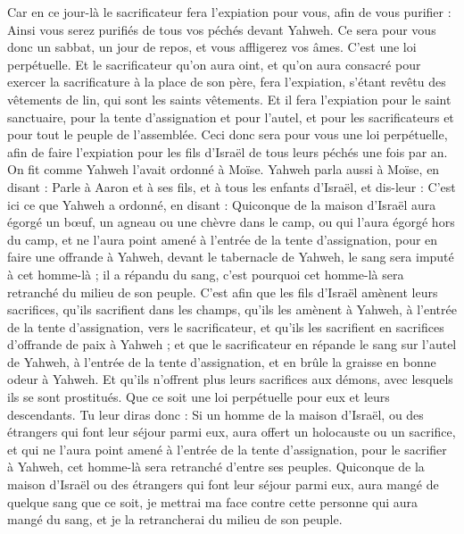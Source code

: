 \begin{multicols}{2}
Car en ce jour-là le sacrificateur fera l’expiation pour vous, afin de vous purifier : Ainsi vous serez purifiés de tous vos péchés devant Yahweh.
Ce sera pour vous donc un sabbat, un jour de repos, et vous affligerez vos âmes. C'est une loi perpétuelle.
Et le sacrificateur qu'on aura oint, et qu'on aura consacré pour exercer la sacrificature à la place de son père, fera l’expiation, s'étant revêtu des vêtements de lin, qui sont les saints vêtements.
Et il fera l’expiation pour le saint sanctuaire, pour la tente d'assignation et pour l'autel, et pour les sacrificateurs et pour tout le peuple de l'assemblée.
Ceci donc sera pour vous une loi perpétuelle, afin de faire l’expiation pour les fils d'Israël de tous leurs péchés une fois par an. On fit comme Yahweh l'avait ordonné à Moïse.
\VerseOne{}Yahweh parla aussi à Moïse, en disant :
Parle à Aaron et à ses fils, et à tous les enfants d'Israël, et dis-leur : C'est ici ce que Yahweh a ordonné, en disant :
Quiconque de la maison d'Israël aura égorgé un bœuf, un agneau ou une chèvre dans le camp, ou qui l'aura égorgé hors du camp,
et ne l'aura point amené à l'entrée de la tente d'assignation, pour en faire une offrande à Yahweh, devant le tabernacle de Yahweh, le sang sera imputé à cet homme-là ; il a répandu du sang, c'est pourquoi cet homme-là sera retranché du milieu de son peuple.
C’est afin que les fils d'Israël amènent leurs sacrifices, qu’ils sacrifient dans les champs, qu'ils les amènent à Yahweh, à l'entrée de la tente d'assignation, vers le sacrificateur, et qu'ils les sacrifient en sacrifices d’offrande de paix à Yahweh ;
et que le sacrificateur en répande le sang sur l'autel de Yahweh, à l'entrée de la tente d'assignation, et en brûle la graisse en bonne odeur à Yahweh.
Et qu'ils n'offrent plus leurs sacrifices aux démons, avec lesquels ils se sont prostitués. Que ce soit une loi perpétuelle pour eux et leurs descendants.
Tu leur diras donc : Si un homme de la maison d'Israël, ou des étrangers qui font leur séjour parmi eux, aura offert un holocauste ou un sacrifice,
et qui ne l'aura point amené à l'entrée de la tente d'assignation, pour le sacrifier à Yahweh, cet homme-là sera retranché d'entre ses peuples.
Quiconque de la maison d'Israël ou des étrangers qui font leur séjour parmi eux, aura mangé de quelque sang que ce soit, je mettrai ma face contre cette personne qui aura mangé du sang, et je la retrancherai du milieu de son peuple.

\end{multicols}
